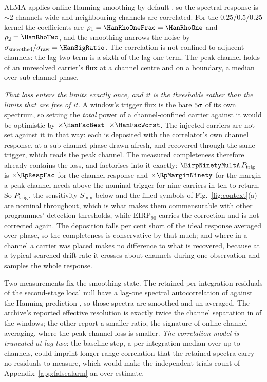 ALMA applies online Hanning smoothing by default \citep{ALMAHandbook}, so
the spectral response is ${\sim}2$ channels wide and neighbouring channels
are correlated. For the $0.25/0.5/0.25$ kernel the coefficients
are $\rho_1=\HanRhoOneFrac=\HanRhoOne$ and $\rho_2=\HanRhoTwo$, and the
smoothing narrows the noise by
$\sigma_{\rm smoothed}/\sigma_{\rm raw}=\HanSigRatio$. The correlation is
not confined to adjacent channels: the lag-two term is a sixth of the
lag-one term. The peak
channel holds \HanBest{} of an unresolved carrier's flux at a channel centre
and \HanWorst{} on a boundary, a median \HanMed{} over sub-channel phase.

\emph{That loss enters the limits exactly once, and it is the thresholds
rather than the limits that are free of it.} A window's trigger flux is the
bare $5\sigma$ of its own spectrum, so setting the \emph{total}
power of a channel-confined carrier against it would be optimistic by
$\times\HanFacBest$--$\times\HanFacWorst$. The injected carriers are not set
against it in that way: each is deposited with the correlator's own channel
response, at a sub-channel phase drawn afresh, and recovered through the same
trigger, which reads the peak channel. The measured completeness therefore
already contains the loss, and factorises into it exactly:
$\EirpNinetyMultA\,P_{\rm trig}$ is $\times\RpRespFac$ for the channel
response and $\times\RpMarginNinety$ for the margin a peak channel needs
above the nominal trigger for nine carriers in ten to return. So
$P_{\rm trig}$, the sensitivity $S_{\min}$ below and the filled symbols of
Fig.~\ref{fig:context}(a) are nominal throughout, which is what makes them
commensurable with other programmes' detection thresholds, while
$\mathrm{EIRP}_{90}$ carries the correction and is not corrected again.
The deposition falls \InjShortPct{} per cent short of the ideal response
averaged over phase, so the completeness is conservative by that much; and
where in a channel a carrier was placed makes no difference to what is
recovered, because at a typical searched drift rate it crosses about
\InjDriftChan{} channels during one observation and samples the whole
response.

Two measurements fix the smoothing state. The retained per-integration
residuals of the second-stage local null have a lag-one spectral
autocorrelation of \LNLagOne{} against the Hanning prediction \HanRhoOne, so
those spectra are smoothed and un-averaged. The archive's reported
effective resolution is exactly twice the channel separation in \NHanTwo{} of
the \NHanKnown{} windows; the other \NHanOther{} report a smaller ratio,
the signature of online channel averaging, where the peak-channel loss is
smaller. \emph{The correlation model is truncated at lag two}: the
baseline step, a per-integration median over up to \MedWin{} channels, could
imprint longer-range correlation that the retained spectra carry no residuals
to measure, which would make the independent-trials count of
Appendix~\ref{app:falsealarm} an over-estimate.

